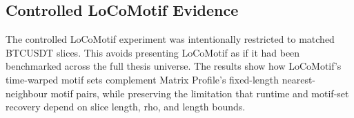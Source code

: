\subsection{Controlled LoCoMotif Evidence}

The controlled LoCoMotif experiment was intentionally restricted to matched BTCUSDT slices. This avoids presenting LoCoMotif as if it had been benchmarked across the full thesis universe. The results show how LoCoMotif's time-warped motif sets complement Matrix Profile's fixed-length nearest-neighbour motif pairs, while preserving the limitation that runtime and motif-set recovery depend on slice length, rho, and length bounds.